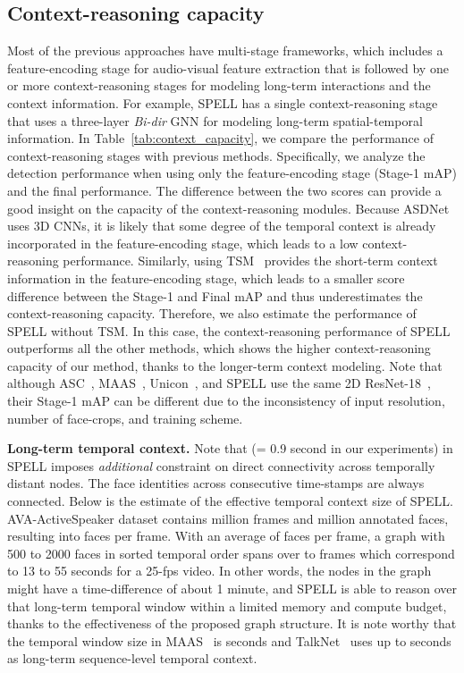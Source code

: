 \documentclass[runningheads]{llncs}
\begin{document}
\subsection{Context-reasoning capacity} \label{long-term-context-reasoning}
Most of the previous approaches have multi-stage frameworks, which includes a feature-encoding stage for audio-visual feature extraction that is followed by one or more context-reasoning stages for modeling long-term interactions and the context information. For example, SPELL has a single context-reasoning stage that uses a three-layer \emph{Bi-dir} GNN for modeling long-term spatial-temporal information. In Table~\ref{tab:context_capacity}, we compare the performance of context-reasoning stages with previous methods. Specifically, we analyze the detection performance when using only the feature-encoding stage (Stage-1 mAP) and the final performance. The difference between the two scores can provide a good insight on the capacity of the context-reasoning modules. Because ASDNet~\cite{ASDNet_ICCV2021} uses 3D CNNs, it is likely that some degree of the temporal context is already incorporated in the feature-encoding stage, which leads to a low context-reasoning performance. Similarly, using TSM~\cite{lin2019tsm} provides the short-term context information in the feature-encoding stage,
which leads to a smaller score difference between the Stage-1 and Final mAP and thus underestimates the context-reasoning capacity.
Therefore, we also estimate the performance of SPELL without TSM. 
In this case, the context-reasoning performance of SPELL outperforms all the other methods, which shows the higher context-reasoning capacity of our method, thanks to the longer-term context modeling. Note that although ASC~\cite{alcazarActiveSpeakersContext2020}, MAAS~\cite{MAAS2021}, Unicon~\cite{zhang2021unicon}, and SPELL use the same 2D ResNet-18~\cite{he2016deep}, their Stage-1 mAP can be different due to the inconsistency of input resolution, number of face-crops, and training scheme.

\par
\textbf{Long-term temporal context. }
Note that  (= 0.9 second in our experiments) in SPELL imposes \emph{additional} constraint on direct connectivity across temporally distant nodes. The face identities across consecutive time-stamps are always connected. 
Below is the estimate of the effective temporal context size of SPELL. 
AVA-ActiveSpeaker dataset contains  million frames and  million annotated faces, resulting into  faces per frame. 
With an average of  faces per frame, a graph with 500 to 2000 faces in sorted temporal order spans over  to  frames which correspond to 13 to 55 seconds for a 25-fps video. 
In other words, the nodes in the graph might have a time-difference of about 1 minute, and SPELL is able to reason over that long-term temporal window within a limited memory and compute budget, thanks to the effectiveness of the proposed graph structure.  
It is note worthy that the temporal window size in MAAS~\cite{MAAS2021} is  seconds and TalkNet~\cite{tao2021someone} uses up to  seconds as long-term sequence-level temporal context. 
\end{document}
